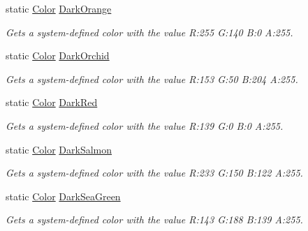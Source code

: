 \begin{DoxyCompactItemize}
static \hyperlink{struct_microsoft_1_1_xna_1_1_framework_1_1_color}{Color} \hyperlink{struct_microsoft_1_1_xna_1_1_framework_1_1_color_aa818ee65188b0702875ee7c53d6e6391}{Dark\+Orange}
\begin{DoxyCompactList}\small\item\em Gets a system-\/defined color with the value R\+:255 G\+:140 B\+:0 A\+:255.\end{DoxyCompactList}\item 
static \hyperlink{struct_microsoft_1_1_xna_1_1_framework_1_1_color}{Color} \hyperlink{struct_microsoft_1_1_xna_1_1_framework_1_1_color_a235a32df5b77092599cf3b2a17252735}{Dark\+Orchid}
\begin{DoxyCompactList}\small\item\em Gets a system-\/defined color with the value R\+:153 G\+:50 B\+:204 A\+:255.\end{DoxyCompactList}\item 
static \hyperlink{struct_microsoft_1_1_xna_1_1_framework_1_1_color}{Color} \hyperlink{struct_microsoft_1_1_xna_1_1_framework_1_1_color_aee6a26b8ac18401f300d0b9b57e82abc}{Dark\+Red}
\begin{DoxyCompactList}\small\item\em Gets a system-\/defined color with the value R\+:139 G\+:0 B\+:0 A\+:255.\end{DoxyCompactList}\item 
static \hyperlink{struct_microsoft_1_1_xna_1_1_framework_1_1_color}{Color} \hyperlink{struct_microsoft_1_1_xna_1_1_framework_1_1_color_ae4717630041a0c2ff31adbbb8e5811a3}{Dark\+Salmon}
\begin{DoxyCompactList}\small\item\em Gets a system-\/defined color with the value R\+:233 G\+:150 B\+:122 A\+:255.\end{DoxyCompactList}\item 
static \hyperlink{struct_microsoft_1_1_xna_1_1_framework_1_1_color}{Color} \hyperlink{struct_microsoft_1_1_xna_1_1_framework_1_1_color_ab8ffe53ee9527b74483ad76bd52a92b1}{Dark\+Sea\+Green}
\begin{DoxyCompactList}\small\item\em Gets a system-\/defined color with the value R\+:143 G\+:188 B\+:139 A\+:255.\end{DoxyCompactList}\item 

\end{DoxyCompactItemize}

